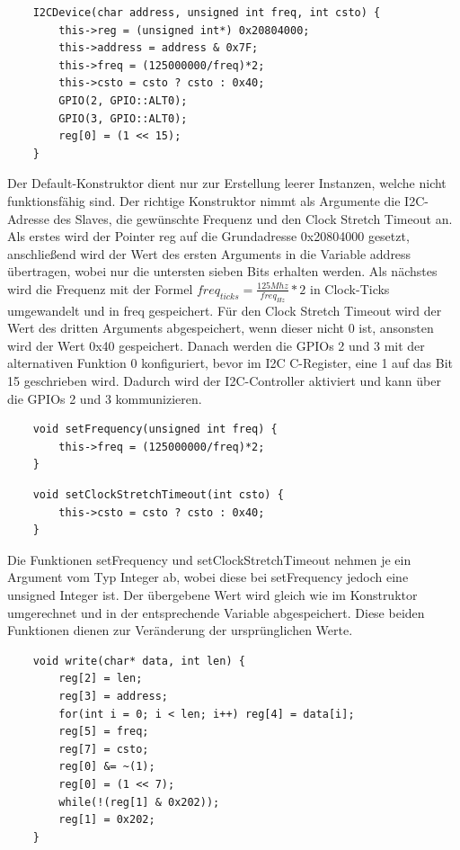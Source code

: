\documentclass[12pt]{article}
\begin{document}
\begin{verbatim}
    I2CDevice(char address, unsigned int freq, int csto) {
        this->reg = (unsigned int*) 0x20804000;
        this->address = address & 0x7F;
        this->freq = (125000000/freq)*2;
        this->csto = csto ? csto : 0x40;
        GPIO(2, GPIO::ALT0);
        GPIO(3, GPIO::ALT0);
        reg[0] = (1 << 15);
    }
\end{verbatim}
Der Default-Konstruktor dient nur zur Erstellung leerer Instanzen, welche nicht funktionsfähig sind. Der richtige Konstruktor nimmt als Argumente die I2C-Adresse des Slaves, die gewünschte Frequenz und den Clock Stretch Timeout an. Als erstes wird der Pointer reg auf die Grundadresse 0x20804000 gesetzt, anschließend wird der Wert des ersten Arguments in die Variable address übertragen, wobei nur die untersten sieben Bits erhalten werden. Als nächstes wird die Frequenz mit der Formel $freq_{ticks} = \frac{125 Mhz}{freq_{Hz}} * 2$ in Clock-Ticks umgewandelt und in freq gespeichert. Für den Clock Stretch Timeout wird der Wert des dritten Arguments abgespeichert, wenn dieser nicht 0 ist, ansonsten wird der Wert 0x40 gespeichert. Danach werden die GPIOs 2 und 3 mit der alternativen Funktion 0 konfiguriert, bevor im I2C C-Register, eine 1 auf das Bit 15 geschrieben wird. Dadurch wird der I2C-Controller aktiviert und kann über die GPIOs 2 und 3 kommunizieren.\\
\begin{verbatim}
    void setFrequency(unsigned int freq) {
        this->freq = (125000000/freq)*2;
    }
\end{verbatim}
\begin{verbatim}
    void setClockStretchTimeout(int csto) {
        this->csto = csto ? csto : 0x40;
    }
\end{verbatim}
Die Funktionen setFrequency und setClockStretchTimeout nehmen je ein Argument vom Typ Integer ab, wobei diese bei setFrequency jedoch eine unsigned Integer ist. Der übergebene Wert wird gleich wie im Konstruktor umgerechnet und in der entsprechende Variable abgespeichert. Diese beiden Funktionen dienen zur Veränderung der ursprünglichen Werte.\\
\begin{verbatim}
    void write(char* data, int len) {
        reg[2] = len;
        reg[3] = address;
        for(int i = 0; i < len; i++) reg[4] = data[i];
        reg[5] = freq;
        reg[7] = csto;
        reg[0] &= ~(1);
        reg[0] = (1 << 7);
        while(!(reg[1] & 0x202));
        reg[1] = 0x202;
    }
\end{verbatim}
\end{document}
